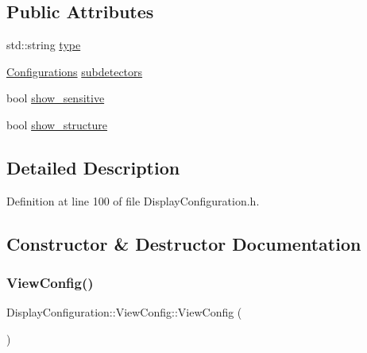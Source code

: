 \subsection*{Public Attributes}
\begin{DoxyCompactItemize}
\item 
std\+::string \hyperlink{class_d_d4hep_1_1_display_configuration_1_1_view_config_ae02fb914afdda0a021ff81d40c928844}{type}
\item 
\hyperlink{class_d_d4hep_1_1_display_configuration_ac43586ae2c70f106cc9027d452d383d7}{Configurations} \hyperlink{class_d_d4hep_1_1_display_configuration_1_1_view_config_ab1466448cad80dfdb76cc9f4c1f252b1}{subdetectors}
\item 
bool \hyperlink{class_d_d4hep_1_1_display_configuration_1_1_view_config_a94ea694c9eaca56a34957275f0602f8f}{show\+\_\+sensitive}
\item 
bool \hyperlink{class_d_d4hep_1_1_display_configuration_1_1_view_config_a354dde730ac96e0795b996a0c344c303}{show\+\_\+structure}
\end{DoxyCompactItemize}


\subsection{Detailed Description}


Definition at line 100 of file Display\+Configuration.\+h.



\subsection{Constructor \& Destructor Documentation}
\hypertarget{class_d_d4hep_1_1_display_configuration_1_1_view_config_a9c9aa8312c88a38b22821eec6fff56d7}{}\label{class_d_d4hep_1_1_display_configuration_1_1_view_config_a9c9aa8312c88a38b22821eec6fff56d7} 
\subsubsection{\texorpdfstring{View\+Config()}{ViewConfig()}\hspace{0.1cm}{\footnotesize\ttfamily [1/2]}}
{\footnotesize\ttfamily Display\+Configuration\+::\+View\+Config\+::\+View\+Config (\begin{DoxyParamCaption}{ }\end{DoxyParamCaption})}



